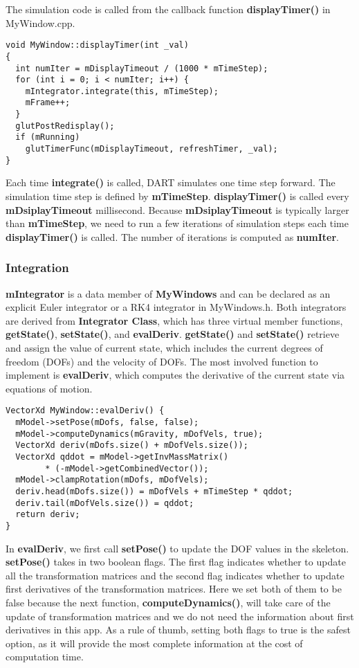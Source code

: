 The simulation code is called from the callback function
\textbf{displayTimer()} in MyWindow.cpp.

\ttfamily
\begin{lstlisting}[caption=MyWindows.cpp]
void MyWindow::displayTimer(int _val)
{
  int numIter = mDisplayTimeout / (1000 * mTimeStep);
  for (int i = 0; i < numIter; i++) {
    mIntegrator.integrate(this, mTimeStep);
    mFrame++;
  }
  glutPostRedisplay();
  if (mRunning)	
    glutTimerFunc(mDisplayTimeout, refreshTimer, _val);
}
\end{lstlisting}
\rmfamily 
Each time \textbf{integrate()} is called, DART simulates one
time step forward. The simulation time step is defined by
\textbf{mTimeStep}. \textbf{displayTimer()} is called every
\textbf{mDsiplayTimeout} millisecond. Because \textbf{mDsiplayTimeout}
is typically larger than \textbf{mTimeStep}, we need to run a few
iterations of simulation steps each time \textbf{displayTimer()} is
called. The number of iterations is computed as \textbf{numIter}.

\subsubsection{Integration}
\textbf{mIntegrator} is a data member of \textbf{MyWindows} and can be
declared as an explicit Euler integrator or a RK4 integrator in
MyWindows.h. Both integrators are derived from \textbf{Integrator
  Class}, which has three virtual member functions,
\textbf{getState()}, \textbf{setState()}, and
\textbf{evalDeriv}. \textbf{getState()} and \textbf{setState()}
retrieve and assign the value of current state, which includes the
current degrees of freedom (DOFs) and the velocity of DOFs. The most
involved function to implement is \textbf{evalDeriv}, which computes
the derivative of the current state via equations of motion.

\ttfamily
\begin{lstlisting}[caption=MyWindows.cpp]
VectorXd MyWindow::evalDeriv() {
  mModel->setPose(mDofs, false, false);
  mModel->computeDynamics(mGravity, mDofVels, true);
  VectorXd deriv(mDofs.size() + mDofVels.size());
  VectorXd qddot = mModel->getInvMassMatrix() 
        * (-mModel->getCombinedVector());
  mModel->clampRotation(mDofs, mDofVels);
  deriv.head(mDofs.size()) = mDofVels + mTimeStep * qddot;
  deriv.tail(mDofVels.size()) = qddot;
  return deriv;
}
\end{lstlisting}
\rmfamily
In \textbf{evalDeriv}, we first call \textbf{setPose()} to update the
DOF values in the skeleton. \textbf{setPose()} takes in two boolean
flags. The first flag indicates whether to update all the
transformation matrices and the second flag indicates whether to
update first derivatives of the transformation matrices. Here we set
both of them to be false because the next function, 
\textbf{computeDynamics()}, will take care of the update of
transformation matrices and we do not need the information about first
derivatives in this app. As a rule of thumb, setting both flags to
true is the safest option, as it will provide the most complete
information at the cost of computation time.

